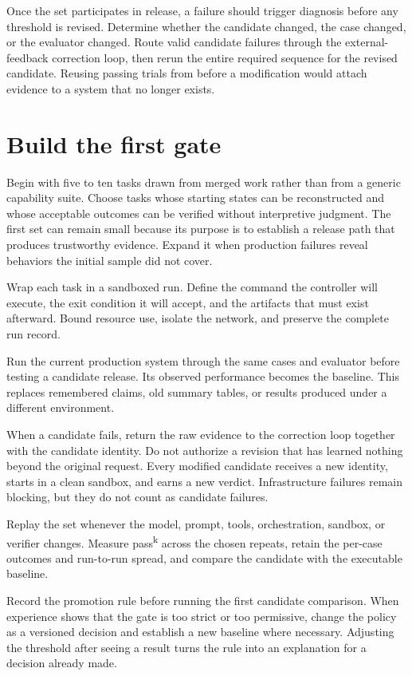 Once the set participates in release, a failure should trigger diagnosis before any threshold is revised. Determine whether the candidate changed, the case changed, or the evaluator changed. Route valid candidate failures through the external-feedback correction loop, then rerun the entire required sequence for the revised candidate. Reusing passing trials from before a modification would attach evidence to a system that no longer exists.

\section{Build the first gate}\label{build-the-first-gate}

Begin with five to ten tasks drawn from merged work rather than from a generic capability suite. Choose tasks whose starting states can be reconstructed and whose acceptable outcomes can be verified without interpretive judgment. The first set can remain small because its purpose is to establish a release path that produces trustworthy evidence. Expand it when production failures reveal behaviors the initial sample did not cover.

Wrap each task in a sandboxed run. Define the command the controller will execute, the exit condition it will accept, and the artifacts that must exist afterward. Bound resource use, isolate the network, and preserve the complete run record.

Run the current production system through the same cases and evaluator before testing a candidate release. Its observed performance becomes the baseline. This replaces remembered claims, old summary tables, or results produced under a different environment.

When a candidate fails, return the raw evidence to the correction loop together with the candidate identity. Do not authorize a revision that has learned nothing beyond the original request. Every modified candidate receives a new identity, starts in a clean sandbox, and earns a new verdict. Infrastructure failures remain blocking, but they do not count as candidate failures.

Replay the set whenever the model, prompt, tools, orchestration, sandbox, or verifier changes. Measure pass\textsuperscript{k} across the chosen repeats, retain the per-case outcomes and run-to-run spread, and compare the candidate with the executable baseline.

Record the promotion rule before running the first candidate comparison. When experience shows that the gate is too strict or too permissive, change the policy as a versioned decision and establish a new baseline where necessary. Adjusting the threshold after seeing a result turns the rule into an explanation for a decision already made.

